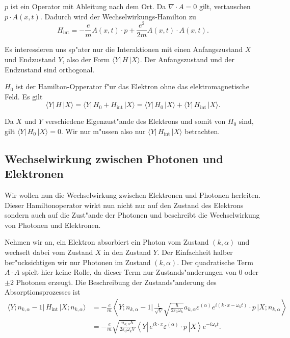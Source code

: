 \begin{refsection}
$p$ ist ein Operator mit Ableitung nach dem Ort. Da $\nabla \cdot A = 0$ gilt, vertauschen $p \cdot A(x, t)$.  Dadurch wird der Wechselwirkungs-Hamilton zu
\begin{equation*}
H_{\text{int}} = -\frac{e}{m} A(x, t) \cdot p + \frac{e^2}{2m}A(x, t) \cdot A(x, t).
\end{equation*}

Es interessieren uns sp"ater nur die Interaktionen mit einen Anfangszustand $X$ und Endzustand $Y$, also der Form $\langle Y| \, H \, |X \rangle$. Der Anfangszustand und der Endzustand sind orthogonal.

$H_0$ ist der Hamilton-Opperator f"ur das Elektron ohne das elektromagnetische Feld. Es gilt
\begin{equation*}
\langle Y| \, H \, |X \rangle = \langle Y| \, H_0 + H_{\text{int}} \, |X \rangle = \langle Y| \, H_0 \, |X \rangle + \langle Y| \, H_{\text{int}} \, |X \rangle.
\end{equation*}

Da $X$ und $Y$ verschiedene Eigenzust"ande des Elektrons und somit von $H_0$ sind, gilt $\langle Y| \, H_0 \, |X \rangle=0$. Wir nur m"ussen also nur $\langle Y| \, H_{\text{int}} \, |X \rangle$ betrachten.

\subsection{Wechselwirkung zwischen Photonen und Elektronen}

Wir wollen nun die Wechselwirkung zwischen Elektronen und Photonen herleiten. Dieser Hamiltonoperator wirkt nun nicht nur auf den Zustand des Elektrons sondern auch auf die Zust"ande der Photonen und beschreibt die Wechselwirkung von Photonen und Elektronen.

Nehmen wir an, ein Elektron absorbiert ein Photon vom Zustand $(k,\alpha)$ und wechselt dabei vom Zustand $X$ in den Zustand $Y$. Der Einfachheit halber ber"ucksichtigen wir nur Photonen im Zustand $(k,\alpha)$. Der quadratische Term $A \cdot A$ spielt hier keine Rolle, da dieser Term nur Zustands"anderungen von $0$ oder $\pm 2$ Photonen erzeugt. Die Beschreibung der Zustands"anderung des Absorptionsprozesses ist
\begin{equation} \label{fq:absorbtion}
\begin{split}
\langle Y; n_{k,\alpha} - 1 |\, H_{\text{int}} \,| X; n_{k,\alpha} \rangle &=
 -\frac{e}{m} \left\langle Y; n_{k,\alpha} - 1 \biggl| 
 \, \frac{1}{\sqrt{V}} \sqrt{\frac{\hbar}{2 \varepsilon_0 \omega_k}}a_{k,\alpha} \varepsilon^{(\alpha)} e^{i(k \cdot x-\omega_k t)} \cdot p \,
\biggl| X; n_{k,\alpha} \right\rangle\\
&= -\frac{e}{m} \sqrt{\frac{n_{k,\alpha} \hbar}{2 \varepsilon_0 \omega_k V}} \left\langle Y \left|
\, e^{ik \cdot x} \varepsilon^{(\alpha)} \cdot p \,
\right| X \right\rangle e^{-i\omega_k t}.
\end{split}
\end{equation}


\end{refsection}
